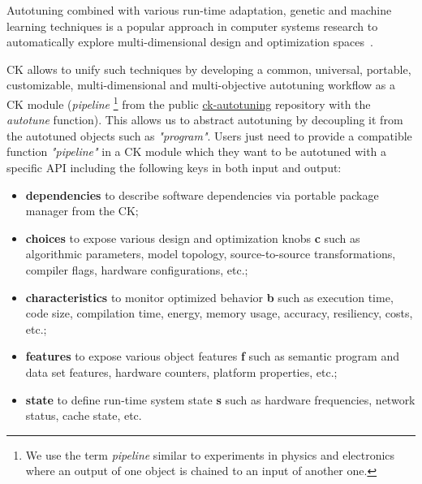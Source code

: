 Autotuning combined with various run-time adaptation,
genetic and machine learning techniques is a popular approach
in computer systems research to automatically explore multi-dimensional 
design and optimization spaces~\cite{atlas, europar97x, CGJ1997, Nis1998,
fftw, CSS99, VE00, KKO2000, FOK02, SAMP2003, Tapus:2002:AHT:762761.762771,
vista, spiral, LCYP04, la2004, FOTP2005, PE2006, HE2008, BCCP2008, JGVP2009,
Ansel:2009:PLC:1542476.1542481, Mars:2010:CAE:1772954.1772991,
DBLP:conf/cc/MooreC13, DBLP:conf/cf/ShenVSAS13, DBLP:conf/cgo/GreweWO13,
Miceli:2012:APA:2451764.2451792,
Manotas:2014:SSE:2568225.2568297,
ashouri2016cobayn}.

CK allows to unify such techniques by developing
a common, universal, portable, customizable, multi-dimensional
and multi-objective autotuning workflow as a CK module
(\textit{pipeline}%
\footnote{We use the term \textit{pipeline} similar to experiments in physics and electronics
where an output of one object is chained to an input of another one.}
from the public
\href{https://github.com/ctuning/ck-autotuning}{ck-autotuning} repository
with the \textit{autotune} function).
%
This allows us to abstract autotuning by decoupling it from the autotuned objects
such as \textit{"program"}.
%
Users just need to provide a compatible function \textit{"pipeline"} in a CK module 
which they want to be autotuned with a specific API including the following keys in both input and output:
\begin{itemize}

\item \textbf{dependencies} to describe software dependencies via portable package manager from the CK;

\item \textbf{choices} to expose various design and optimization knobs \textbf{c} such as algorithmic parameters, model topology, source-to-source transformations, compiler flags, hardware configurations, etc.;

\item \textbf{characteristics} to monitor optimized behavior \textbf{b} such as execution time, code size, compilation time, energy, memory usage, accuracy, resiliency, costs, etc.;

\item \textbf{features} to expose various object features \textbf{f} such as semantic program and data set features, hardware counters, platform properties, etc.;

\item \textbf{state} to define run-time system state \textbf{s} such as hardware frequencies, network status, cache state, etc.

\end{itemize}

